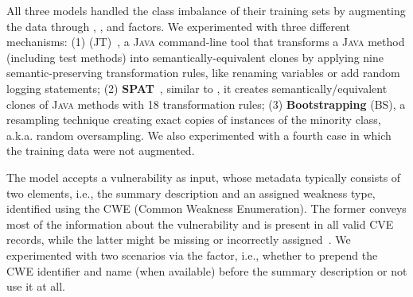 All three models handled the class imbalance of their training sets by augmenting the data through \fndAug, \lnkAug, and \glbAug factors.
We experimented with three different mechanisms:
(1) \textbf{\JavaTransformer} (JT)~\cite{rabin:ist2021:javatransformer}, a \textsc{Java} command-line tool that transforms a \textsc{Java} method (including test methods) into semantically-equivalent clones by applying nine semantic-preserving transformation rules, like renaming variables or add random logging statements;
(2) \textbf{SPAT}~\cite{yu:jss2022:spat}, similar to \JavaTransformer, it creates semantically\-/equivalent clones of \textsc{Java} methods with 18 transformation rules;
(3) \textbf{Bootstrapping} (BS), a resampling technique creating exact copies of instances of the minority class, a.k.a. random oversampling.
%
We also experimented with a fourth case in which the training data were not augmented.



The \linker model accepts a vulnerability as input, whose metadata typically consists of two elements, i.e., the summary description and an assigned weakness type, identified using the CWE (Common Weakness Enumeration).
The former conveys most of the information about the vulnerability and is present in all valid CVE records, while the latter might be missing or incorrectly assigned~\cite{Pan:icse23:cwe}.
We experimented with two scenarios via the \lnkCwe factor, i.e., whether to prepend the CWE identifier and name (when available) before the summary description or not use it at all.

